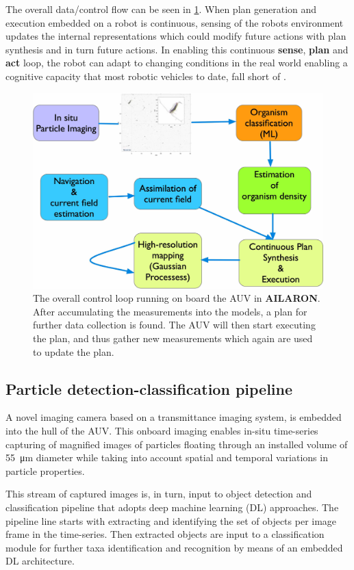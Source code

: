 \documentclass[conference]{IEEEtran}
\def\proje{{\textbf{AILARON}}}
\begin{document}
The overall data/control flow can be seen in
\cref{fig:sensePlanActLoop}.  When plan generation and execution
embedded on a robot is continuous, sensing of the robots environment
updates the internal representations which could modify future actions
with plan synthesis and in turn future actions.  In enabling this
continuous \textbf{sense}, \textbf{plan} and \textbf{act} loop, the
robot can adapt to changing conditions in the real world enabling a
cognitive capacity that most robotic vehicles to date, fall short of
\cite{rajan12}.

\begin{figure}[tbp]
\centerline{\includegraphics[width=0.8\linewidth]{figures/workflow-simplified.jpg}}
\caption{The overall control loop running on board the AUV in \proje. After accumulating the measurements into the models, a plan for further data collection is found. The AUV will then start executing the plan, and thus gather new measurements which again are used to update the plan.}
\label{fig:sensePlanActLoop}
\end{figure}

\subsection{Particle detection-classification pipeline}

A novel imaging camera \cite{Davies2017a} based on a transmittance
imaging system, is embedded into the hull of the AUV. This onboard
imaging enables in-situ time-series capturing of magnified images of
particles floating through an installed volume of \SI{55}{\micro\meter}
diameter while taking into account spatial and temporal variations in
particle properties.

This stream of captured images is, in turn, input to object detection
and classification pipeline that adopts deep machine learning (DL)
approaches. The pipeline line starts with extracting and identifying
the set of objects per image frame in the time-series. Then extracted
objects are input to a classification module for further taxa
identification and recognition by means of an embedded DL
architecture.
\end{document}
